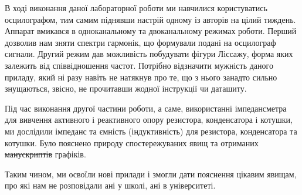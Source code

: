 
В ході виконання даної лабораторної роботи ми навчилися користуватись осцилографом, тим самим піднявши настрій одному із авторів на цілий тиждень. Аппарат вмикався в одноканальному та двоканальному режимах роботи. Перший дозволив нам зняти спектри гармонік, що формували подані на осцилограф сигнали. Другий режим дав можливість побудувати фігури Ліссажу, форма яких залежить від співвідношення частот. Потрібно відзначити мужність даного приладу, який ні разу навіть не натякнув про те, що з нього занадто сильно знущаються, звісно, не прочитавши жодної інструкції чи даташиту.

Під час виконання другої частини роботи, а саме, використанні імпедансметра для вивчення активного і реактивного опору резистора, конденсатора і котушки, ми дослідили імпеданс та ємність (індуктивність) для резистора, конденсатора та котушки. Було пояснено природу спостережуваних явищ та отриманих \sout{манускриптів} графіків.

Таким чином, ми освоїли нові прилади і змогли дати пояснення цікавим явищам, про які нам не розповідали ані у школі, ані в університеті.

